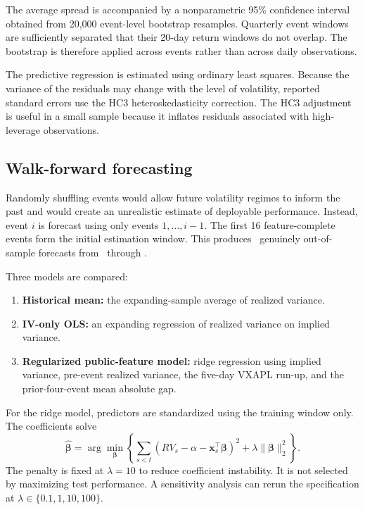 \documentclass[11pt]{article}
\begin{document}
The average spread is accompanied by a nonparametric 95\% confidence interval obtained from 20,000 event-level bootstrap resamples. Quarterly event windows are sufficiently separated that their 20-day return windows do not overlap. The bootstrap is therefore applied across events rather than across daily observations.

The predictive regression is estimated using ordinary least squares. Because the variance of the residuals may change with the level of volatility, reported standard errors use the HC3 heteroskedasticity correction. The HC3 adjustment is useful in a small sample because it inflates residuals associated with high-leverage observations.

\subsection{Walk-forward forecasting}

Randomly shuffling events would allow future volatility regimes to inform the past and would create an unrealistic estimate of deployable performance. Instead, event $i$ is forecast using only events $1,\ldots,i-1$. The first 16 feature-complete events form the initial estimation window. This produces \TestN\ genuinely out-of-sample forecasts from \TestStart\ through \TestEnd.

Three models are compared:

\begin{enumerate}[leftmargin=1.5em]
    \item \textbf{Historical mean:} the expanding-sample average of realized variance.
    \item \textbf{IV-only OLS:} an expanding regression of realized variance on implied variance.
    \item \textbf{Regularized public-feature model:} ridge regression using implied variance, pre-event realized variance, the five-day VXAPL run-up, and the prior-four-event mean absolute gap.
\end{enumerate}

For the ridge model, predictors are standardized using the training window only. The coefficients solve
\begin{equation}
\widehat{\boldsymbol{\beta}}
=
\arg\min_{\boldsymbol{\beta}}
\left\{
\sum_{s<t}
\left(RV_s-\alpha-\mathbf{x}_s^\top\boldsymbol{\beta}\right)^2
+
\lambda\lVert\boldsymbol{\beta}\rVert_2^2
\right\}.
\end{equation}
The penalty is fixed at $\lambda=10$ to reduce coefficient instability. It is not selected by maximizing test performance. A sensitivity analysis can rerun the specification at $\lambda\in\{0.1,1,10,100\}$.
\end{document}
